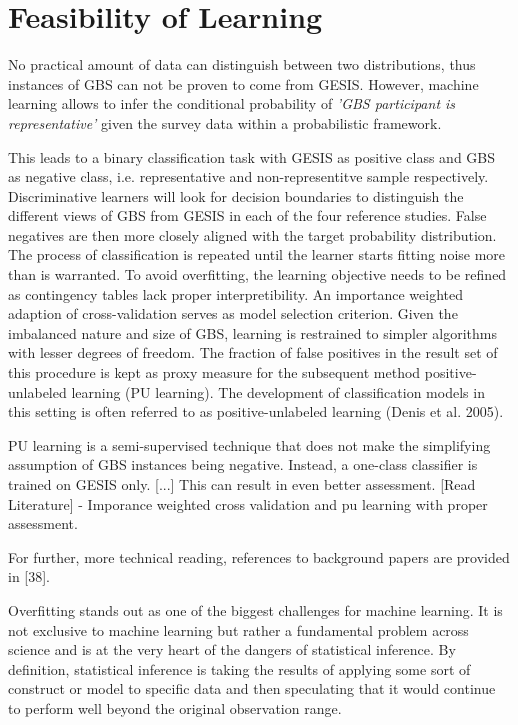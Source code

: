 \chapter{Feasibility of Learning}\label{Sec:Feasibility of Learning}

No practical amount of data can distinguish between two distributions, thus instances of GBS can not be proven to come from GESIS. However, machine learning allows to infer the conditional probability of \textit{'GBS participant is representative'} given the survey data within a probabilistic framework. 

This leads to a binary classification task with GESIS as positive class and GBS as negative class, i.e. representative and non-representitve sample respectively. Discriminative learners will look for decision boundaries to distinguish the different views of GBS from GESIS in each of the four reference studies. False negatives are then more closely aligned with the target probability distribution. The process of classification is repeated until the learner starts fitting noise more than is warranted. To avoid overfitting, the learning objective needs to be refined as contingency tables lack proper interpretibility. An importance weighted adaption of cross-validation serves as model selection criterion. Given the imbalanced nature and size of GBS, learning is restrained to simpler algorithms with lesser degrees of freedom. The fraction of false positives in the result set of this procedure is kept as proxy measure for the subsequent method positive-unlabeled learning (PU learning). The development of classiﬁcation models in this setting is often referred to as positive-unlabeled learning (Denis et al. 2005).



PU learning is a semi-supervised technique that does not make the simplifying assumption of GBS instances being negative. Instead, a one-class classifier is trained on GESIS only. [...] This can result in even better assessment. [Read Literature] - Imporance weighted cross validation and pu learning with proper assessment.

%

For further, more technical reading, references to background papers are provided in [38].

Overﬁtting stands out as one of the biggest challenges for machine learning. It is not exclusive to machine learning but rather a fundamental problem across science and is at the very heart of the dangers of statistical inference. By deﬁnition, statistical inference is taking the results of applying some sort of construct or model to speciﬁc data and then speculating that it would continue to perform well beyond the original observation range.

